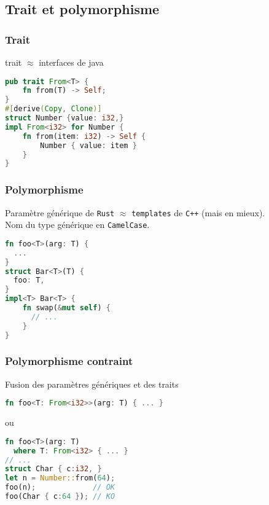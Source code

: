 \subsection{Trait et polymorphisme}
\subsubsection{Trait}
\begin{frame}[fragile]
  trait $\approx$ interfaces de java
      \begin{lstlisting}[language=Rust]
pub trait From<T> {
    fn from(T) -> Self;
}
#[derive(Copy, Clone)]
struct Number {value: i32,}
impl From<i32> for Number {
    fn from(item: i32) -> Self {
        Number { value: item }
    }
}
      \end{lstlisting}
\end{frame}
\subsubsection{Polymorphisme}
\begin{frame}[fragile]
  Paramètre générique de \texttt{Rust} $\approx$ \texttt{templates} de
  \texttt{C++} (mais en mieux).\\
  Nom du type générique en \texttt{CamelCase}.
      \begin{lstlisting}[language=Rust]
fn foo<T>(arg: T) {
  ...
}
struct Bar<T>(T) {
  foo: T,
}
impl<T> Bar<T> {
    fn swap(&mut self) {
      // ...
    }
}
      \end{lstlisting}
\end{frame}
\subsubsection{Polymorphisme contraint}
\begin{frame}[fragile]
  Fusion des paramètres génériques et des traits
      \begin{lstlisting}[language=Rust]
fn foo<T: From<i32>>(arg: T) { ... }
      \end{lstlisting}
      ou
      \begin{lstlisting}[language=Rust]
fn foo<T>(arg: T)
  where T: From<i32> { ... }
// ...
struct Char { c:i32, }
let n = Number::from(64);
foo(n);             // OK
foo(Char { c:64 }); // KO
      \end{lstlisting}
\end{frame}
